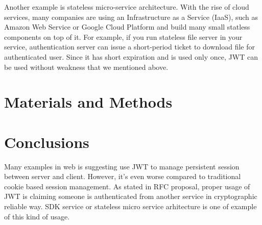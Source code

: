 \documentclass[journal,article,submit,moreauthors,pdftex,10pt,a4paper]{mdpi}
\begin{document}
Another example is stateless micro-service architecture. With the rise of cloud services, many companies are using an Infrastructure as a Service (IaaS), such as Amazon Web Service or Google Cloud Platform and build many small statless components on top of it. For example, if you run stateless file server in your service, authentication server can issue a short-period ticket to download file for authenticated user. Since it has short expiration and is used only once, JWT can be used without weakness that we mentioned above.

\section{Materials and Methods}




\section{Conclusions}
Many examples in web is suggesting use JWT to manage persistent session between server and client. However, it's even worse compared to traditional cookie based session management. As stated in RFC proposal, proper usage of JWT is claiming someone is authenticated from another service in cryptographic reliable way. SDK service or stateless micro service arhitecture is one of example of this kind of usage.
\end{document}
